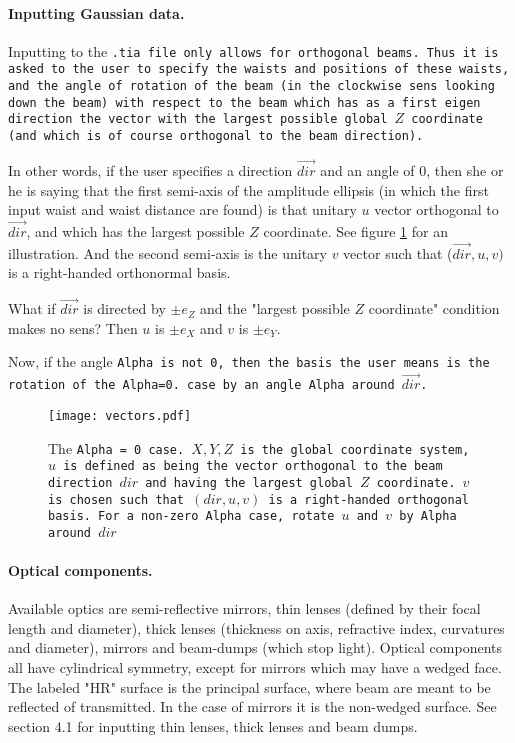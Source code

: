 \documentclass{article}
\begin{document}
\paragraph{Inputting Gaussian data.}Inputting to the \tt{.tia} file only allows for orthogonal beams. Thus it is asked to the user to specify the waists and positions of these waists, and the angle of rotation of the beam (in the clockwise sens looking down the beam) with respect to the beam which has as a first eigen direction the vector with the largest possible global $Z$ coordinate (and which is of course orthogonal to the beam direction).

In other words, if the user specifies a direction $\vec{dir}$ and an angle of 0, then she or he is saying that the first semi-axis of the amplitude ellipsis (in which the first input waist and waist distance are found) is that unitary $u$ vector orthogonal to $\vec{dir}$, and which has the largest possible $Z$ coordinate. See figure \ref{vectors} for an illustration. And the second semi-axis is the unitary $v$ vector such that ($\vec{dir}, u, v)$ is a right-handed orthonormal basis.

What if $\vec{dir}$ is directed by $\pm e_Z$ and the "largest possible $Z$ coordinate" condition makes no sens? Then $u$ is $\pm e_X$ and $v$ is $\pm e_Y$.

Now, if the angle \tt{Alpha} is not 0, then the basis the user means is the rotation of the \tt{Alpha=0.} case by an angle \tt{Alpha} around $\vec{dir}$.

\begin{figure}[h]
\begin{center}
\texttt{[image: vectors.pdf]}
\caption{The \tt{Alpha = 0} case. $X, Y, Z$ is the global coordinate system, $u$ is defined as being the vector orthogonal to the beam direction $dir$ and having the largest global $Z$ coordinate. $v$ is chosen such that $(dir, u, v)$ is a right-handed orthogonal basis. For a non-zero  \tt{Alpha} case, rotate $u$ and $v$ by \tt{Alpha} around $dir$}
\label{vectors}
\end{center}
\end{figure}

\paragraph{Optical components.}Available optics are semi-reflective mirrors, thin lenses (defined by their focal length and diameter), thick lenses (thickness on axis, refractive index, curvatures and diameter), mirrors and beam-dumps (which stop light). Optical components all have cylindrical symmetry, except for mirrors which may have a wedged face. The labeled "HR" surface is the principal surface, where beam are meant to be reflected of transmitted. In the case of mirrors it is the non-wedged surface. See section 4.1 for inputting thin lenses, thick lenses and beam dumps.
\end{document}
